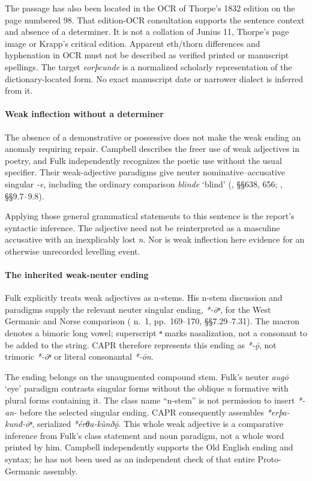 \documentclass[
  british,
  a4paper,
]{article}
\begin{document}
The passage has also been located in the OCR of Thorpe's 1832 edition on
the page numbered 98. That edition-OCR consultation supports the
sentence context and absence of a determiner. It is not a collation of
Junius 11, Thorpe's page image or Krapp's critical edition. Apparent
eth/thorn differences and hyphenation in OCR must not be described as
verified printed or manuscript spellings. The target \emph{eorþcunde} is
a normalized scholarly representation of the dictionary-located form. No
exact manuscript date or narrower dialect is inferred from it.

\paragraph{Weak inflection without a
determiner}\label{weak-inflection-without-a-determiner}

The absence of a demonstrative or possessive does not make the weak
ending an anomaly requiring repair. Campbell describes the freer use of
weak adjectives in poetry, and Fulk independently recognizes the poetic
use without the usual specifier. Their weak-adjective paradigms give
neuter nominative--accusative singular \emph{-e}, including the ordinary
comparison \emph{blinde} `blind' (, §§638, 656; , §§9.7--9.8).

Applying those general grammatical statements to this sentence is the
report's syntactic inference. The adjective need not be reinterpreted as
a masculine accusative with an inexplicably lost \emph{n}. Nor is weak
inflection here evidence for an otherwise unrecorded levelling event.

\paragraph{The inherited weak-neuter
ending}\label{the-inherited-weak-neuter-ending}

Fulk explicitly treats weak adjectives as n-stems. His n-stem discussion
and paradigms supply the relevant neuter singular ending, \emph{*-ōⁿ},
for the West Germanic and Norse comparison ( n.~1, pp.~169--170, §§7.29--7.31). The macron denotes a
bimoric long vowel; superscript \emph{ⁿ} marks nasalization, not a
consonant to be added to the string. CAPR therefore represents this
ending as \emph{*-ǭ}, not trimoric \emph{*-ôⁿ} or literal consonantal
\emph{*-ōn}.

The ending belongs on the unaugmented compound stem. Fulk's neuter
\emph{augō} `eye' paradigm contrasts singular forms without the oblique
\emph{n} formative with plural forms containing it. The class name
``n-stem'' is not permission to insert \emph{*-an-} before the selected
singular ending. CAPR consequently assembles \emph{*erþa-kunđ-ōⁿ},
serialized \emph{*érθa-kùnðǭ}. This whole weak adjective is a
comparative inference from Fulk's class statement and noun paradigm, not
a whole word printed by him. Campbell independently supports the Old
English ending and syntax; he has not been used as an independent check
of that entire Proto-Germanic assembly.
\end{document}
